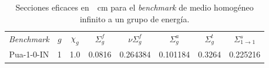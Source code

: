 \documentclass[11pt]{article}
\numberwithin{equation}{section}
\begin{document}
{
\begin{table}[h!]
\begin{center}
\begin{tabular}{cccccccc}
\small \emph{Benchmark}  & \small $g$ & \small $\chi_g$ & \small $\Sigma^{f}_g$ & \small $\nu\Sigma^{f}_g$ & \small $\Sigma^{a}_g$ & \small $\Sigma^{t}_g$ & \small $\Sigma^s_{1 \rightarrow 1}$ \\
\small Pua-1-0-IN & \tiny \num{1} & \tiny \num{1.0} & \tiny \num{0.0816} & \tiny \num{0.264384} & \tiny \num{0.101184} & \tiny \num{0.3264} & \tiny \num{0.225216}
\end{tabular}
\caption{\label{tabla:xs-pua} Secciones eficaces en~\si{\per\centi\metre} para el \emph{benchmark} de medio homogéneo infinito a un grupo de energía.}
\end{center}
\end{table}
}
\end{document}
